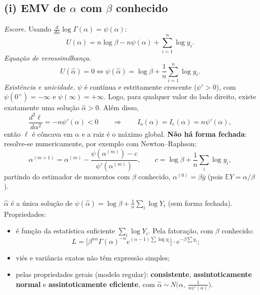 \documentclass[11pt,a4paper]{article}
\newcommand{\E}{\mathbb{E}}
\theoremstyle{definition}
\theoremstyle{plain}
\begin{document}
\subsection*{(i) EMV de $\alpha$ com $\beta$ conhecido}
\textit{Escore.} Usando $\frac{d}{d\alpha}\log\Gamma(\alpha)=\psi(\alpha)$:
\[
U(\alpha)=n\log\beta-n\psi(\alpha)+\sum_{i=1}^n\log y_i .
\]
\textit{Equação de verossimilhança.}
\[
U(\hat\alpha)=0\iff\psi(\hat\alpha)=\log\beta+\frac1n\sum_{i=1}^n\log y_i .
\]
\textit{Existência e unicidade.} $\psi$ é contínua e estritamente crescente ($\psi'>0$), com $\psi(0^+)=-\infty$ e $\psi(\infty)=+\infty$. Logo, para qualquer valor do lado direito, existe exatamente uma solução $\hat\alpha>0$. Além disso,
\[
\frac{d^2\ell}{d\alpha^2}=-n\psi'(\alpha)<0
\qquad\Longrightarrow\qquad
I_o(\alpha)=I_e(\alpha)=n\psi'(\alpha),
\]
então $\ell$ é côncava em $\alpha$ e a raiz é o máximo global. \textbf{Não há forma fechada}: resolve-se numericamente, por exemplo com Newton--Raphson:
\[
\alpha^{(m+1)}=\alpha^{(m)}-\frac{\psi(\alpha^{(m)})-c}{\psi'(\alpha^{(m)})},\qquad c=\log\beta+\frac1n\sum_i\log y_i,
\]
partindo do estimador de momentos com $\beta$ conhecido, $\alpha^{(0)}=\beta\bar y$ (pois $\E Y=\alpha/\beta$).

\begin{resposta}
$\hat\alpha$ é a única solução de $\psi(\hat\alpha)=\log\beta+\frac1n\sum_i\log Y_i$ (sem forma fechada). Propriedades:
\begin{itemize}[leftmargin=1.2em]
\item é função da estatística suficiente $\sum_i\log Y_i$. Pela fatoração, com $\beta$ conhecido:
\[L=\Big[\beta^{n\alpha}\Gamma(\alpha)^{-n}e^{(\alpha-1)\sum\log y_i}\Big]\cdot e^{-\beta\sum y_i};\]
\item viés e variância exatos não têm expressão simples;
\item pelas propriedades gerais (modelo regular): \textbf{consistente}, \textbf{assintoticamente normal} e \textbf{assintoticamente eficiente}, com $\hat\alpha\ \dot\sim\ N\big(\alpha,\ \frac{1}{n\psi'(\alpha)}\big)$.
\end{itemize}
\end{resposta}
\end{document}
